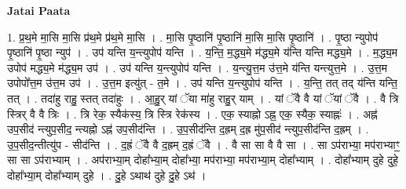 \documentclass[17pt]{extarticle}
\begin{document}
\textbf{Jatai Paata} \newline

1. प्र॒थ॒मे मा॒सि मा॒सि प्र॑थ॒मे प्र॑थ॒मे मा॒सि । . मा॒सि पृ॒ष्ठानि॑ पृ॒ष्ठानि॑ मा॒सि मा॒सि पृ॒ष्ठानि॑ । . पृ॒ष्ठा न्युपोप॑ पृ॒ष्ठानि॑ पृ॒ष्ठा न्युप॑ । . उप॑ यन्ति य॒न्त्युपोप॑ यन्ति । . य॒न्ति॒ म॒द्ध्य॒मे म॑द्ध्य॒मे य॑न्ति यन्ति मद्ध्य॒मे । . म॒द्ध्य॒म उपोप॑ मद्ध्य॒मे म॑द्ध्य॒म उप॑ । . उप॑ यन्ति य॒न्त्युपोप॑ यन्ति । . य॒न्त्यु॒त्त॒म उ॑त्त॒मे य॑न्ति यन्त्युत्त॒मे । . उ॒त्त॒म उपोपो᳚त्त॒म उ॑त्त॒म उप॑ । . उ॒त्त॒म इत्यु॑त् - त॒मे । . उप॑ यन्ति य॒न्त्युपोप॑ यन्ति । . य॒न्ति॒ तत् तद् य॑न्ति यन्ति॒ तत् । . तदा॑हु राहु॒ स्तत् तदा॑हुः । . आ॒हु॒र् यां ॅया मा॑हु राहु॒र् याम् । . यां ॅवै वै यां ॅयां ॅवै । . वै त्रि स्त्रिर् वै वै त्रिः । . त्रि रेक॒ स्यैक॑स्य॒ त्रि स्त्रि रेक॑स्य । . एक॒ स्याह्नो ऽह्न॒ एक॒ स्यैक॒ स्याह्नः॑ । . अह्न॑ उप॒सीद॑ न्त्युप॒सीद॒ न्त्यह्नो ऽह्न॑ उप॒सीद॑न्ति । . उ॒प॒सीद॑न्ति द॒ह्रम् द॒ह्र मु॑प॒सीद॑ न्त्युप॒सीद॑न्ति द॒ह्रम् । . उ॒प॒सीद॒न्तीत्यु॑प - सीद॑न्ति । . द॒ह्रं ॅवै वै द॒ह्रम् द॒ह्रं ॅवै । . वै सा सा वै वै सा । . सा ऽप॑राभ्या॒ मप॑राभ्याꣳ॒॒ सा सा ऽप॑राभ्याम् । . अप॑राभ्या॒म् दोहा᳚भ्या॒म् दोहा᳚भ्या॒ मप॑राभ्या॒ मप॑राभ्या॒म् दोहा᳚भ्याम् । . दोहा᳚भ्याम् दुहे दुहे॒ दोहा᳚भ्या॒म् दोहा᳚भ्याम् दुहे । . दु॒हे ऽथाथ॑ दुहे दु॒हे ऽथ॑ । \newline
\end{document}
